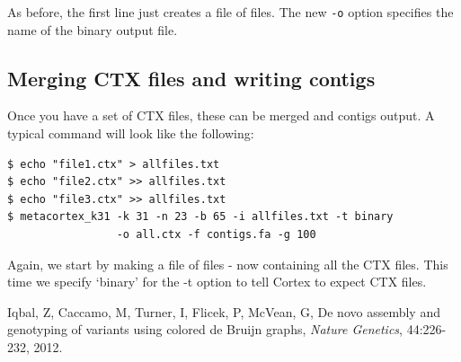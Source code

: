 \documentclass[a4paper,11pt,oneside]{article}
\begin{document}
\noindent  As before, the first line just creates a file of files. The new \verb=-o= option specifies the name of the binary output file.

\subsection{Merging CTX files and writing contigs}

Once you have a set of CTX files, these can be merged and contigs output. A typical command will look like the following:
\vspace{6pt}
\begin{verbatim}
$ echo "file1.ctx" > allfiles.txt
$ echo "file2.ctx" >> allfiles.txt
$ echo "file3.ctx" >> allfiles.txt
$ metacortex_k31 -k 31 -n 23 -b 65 -i allfiles.txt -t binary
                 -o all.ctx -f contigs.fa -g 100
\end{verbatim}
\vspace{6pt}
Again, we start by making a file of files - now containing all the CTX files. This time we specify `binary' for the -t option to tell Cortex to expect CTX files. 

\begin{thebibliography}{9}
Iqbal, Z, Caccamo, M, Turner, I, Flicek, P, McVean, G, De novo assembly and genotyping of variants using colored de Bruijn graphs, \emph{Nature Genetics}, 44:226-232, 2012.
\end{thebibliography}
\end{document}
